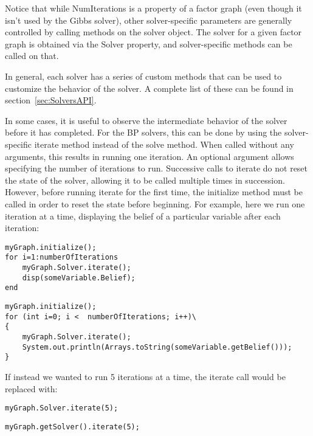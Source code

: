 Notice that while NumIterations is a property of a factor graph (even though it isn't used by the Gibbs solver), other solver-specific parameters are generally controlled by calling methods on the solver object.  The solver for a given factor graph is obtained via the Solver property, and solver-specific methods can be called on that.

In general, each solver has a series of custom methods that can be used to customize the behavior of the solver.  A complete list of these can be found in section~\ref{sec:SolversAPI}.

In some cases, it is useful to observe the intermediate behavior of the solver before it has completed.  For the BP solvers, this can be done by using the solver-specific iterate method instead of the solve method.  When called without any arguments, this results in running one iteration.  An optional argument allows specifying the number of iterations to run.  Successive calls to iterate do not reset the state of the solver, allowing it to be called multiple times in succession.  However, before running iterate for the first time, the initialize method must be called in order to reset the state before beginning.  For example, here we run one iteration at a time, displaying the belief of a particular variable after each iteration:

\ifmatlab

\begin{lstlisting}
myGraph.initialize();
for i=1:numberOfIterations
	myGraph.Solver.iterate();
	disp(someVariable.Belief);
end
\end{lstlisting}

\fi

\ifjava

\begin{lstlisting}
myGraph.initialize();
for (int i=0; i <  numberOfIterations; i++)\
{
	myGraph.Solver.iterate();
	System.out.println(Arrays.toString(someVariable.getBelief()));
}
\end{lstlisting}

\fi

If instead we wanted to run 5 iterations at a time, the iterate call would be replaced with:

\ifmatlab

\begin{lstlisting}
myGraph.Solver.iterate(5);
\end{lstlisting}

\fi

\ifjava
\begin{lstlisting}
myGraph.getSolver().iterate(5);
\end{lstlisting}

